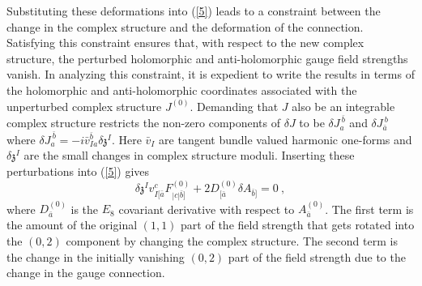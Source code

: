 \documentclass[12pt]{article}
\numberwithin{equation}{section}
\begin{document}
Substituting these deformations into (\ref{5}) leads to a constraint between the change in the complex structure and the deformation of the connection. Satisfying this constraint ensures that, with respect to the new complex structure, the perturbed holomorphic and anti-holomorphic gauge field strengths vanish. In analyzing this constraint, it is expedient to write the results in terms of the holomorphic and anti-holomorphic coordinates associated with the unperturbed complex structure $J^{(0)}$. Demanding that $J$ also be an integrable complex structure restricts the non-zero components of $\delta J$ to be $\delta J_{a}^{~{\bar{b}}}$ and $\delta J_{{\bar{a}}}^{~b}$ where $\delta J_{a}^{~{\bar{b}}}=-i{\bar{v}}_{I a}^{{\bar{b}}} \delta {\mathfrak{z}}^{I}$.
Here ${\bar{v}}_{I }$ are tangent bundle valued harmonic one-forms and $ \delta {\mathfrak{z}}^{I}$ are the small changes in complex structure moduli. Inserting these perturbations into (\ref{5}) gives
%
\begin{equation}
\delta {\mathfrak{z}}^{I} v_{I [{\bar{a}}}^{c}F_{|c|{\bar{b}}]}^{(0)} + 2D^{(0)}_{[{\bar{a}}} \delta A_{{\bar{b}}]}=0 \ ,
\label{6}
\end{equation}
%
where $D^{(0)}_{\bar{a}}$ is the $E_{8}$ covariant derivative with respect to $A^{(0)}_{\bar{a}}$.
The first term is the amount of the original $(1,1)$ part of the field strength that gets rotated into the 
$(0,2)$ component by changing the complex structure. The second term is the change in the initially vanishing $(0,2)$ part of the field strength due to the change in the gauge connection.
\end{document}
